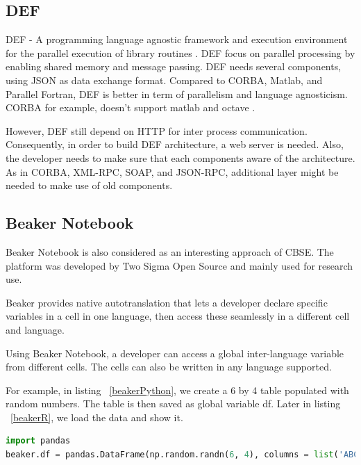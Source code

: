 \documentclass[conference]{IEEEtran}
\begin{document}
\subsection{DEF}

DEF - A programming language agnostic framework and execution environment 
for the parallel execution of library routines \cite{feilhauer2016def}. 
DEF focus on parallel processing by enabling shared memory and message passing. 
DEF needs several components, using JSON as data exchange format. 
Compared to CORBA, Matlab, and Parallel Fortran, DEF is better in term of 
parallelism and language agnosticism. CORBA for example, doesn't support matlab and 
octave \cite{feilhauer2016def}. 

However, DEF still depend on HTTP for inter process communication. Consequently, 
in order to build DEF architecture, a web server is needed. Also, the developer needs 
to make sure that each components aware of the architecture. As in CORBA, XML-RPC, 
SOAP, and JSON-RPC, additional layer might be needed to make use of old components.

\subsection{Beaker Notebook}

Beaker Notebook \cite{beakernotebook} is also considered as an interesting 
approach of CBSE. The platform was developed by Two Sigma Open Source and 
mainly used for research use. 

Beaker provides native autotranslation that lets a developer declare specific 
variables in a cell in one language, then access these seamlessly in a 
different cell and language.

Using Beaker Notebook, a developer can access a global inter-language variable
from different cells. The cells can also be written in any language supported.

For example, in listing ~\ref{beakerPython}, we create a 6 by 4 table populated with
random numbers. The table is then saved as global variable df. 
Later in listing ~\ref{beakerR}, we load the data and show it.

\begin{lstlisting}[caption=Beaker Python Cell Example, label=beakerPython, language=python, basicstyle=\small, breaklines=true]
import pandas
beaker.df = pandas.DataFrame(np.random.randn(6, 4), columns = list('ABCD'))
\end{lstlisting}
\end{document}
